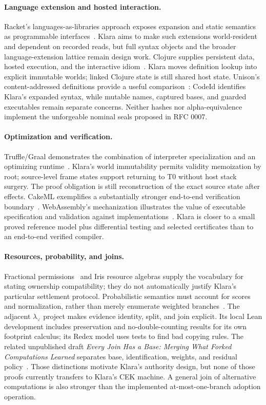 \documentclass[acmsmall,screen,review,nonacm]{acmart}
\begin{document}
\paragraph{Language extension and hosted interaction.}
Racket's languages-as-libraries approach exposes expansion and static semantics
as programmable interfaces~\cite{racket2011}. Klara aims to make such extensions
world-resident and dependent on recorded reads, but full syntax objects and
the broader language-extension lattice remain design work. Clojure supplies
persistent data, hosted execution, and the interactive idiom~\cite{clojure2020}.
Klara moves definition lookup into explicit immutable worlds; linked Clojure
state is still shared host state. Unison's content-addressed definitions
provide a useful comparison~\cite{unison}: CodeId identifies Klara's expanded
syntax, while mutable names, captured bases, and guarded executables remain
separate concerns. Neither hashes nor alpha-equivalence implement the
unforgeable nominal seals proposed in RFC 0007.

\paragraph{Optimization and verification.}
Truffle/Graal demonstrates the combination of interpreter specialization and
an optimizing runtime~\cite{truffle2013}. Klara's world immutability permits
validity memoization by root; source-level frame states support returning to
T0 without host stack surgery. The proof obligation is still reconstruction
of the exact source state after effects. CakeML exemplifies a substantially
stronger end-to-end verification boundary~\cite{cakeml2014}. WebAssembly's
mechanization illustrates the value of executable specification and validation
against implementations~\cite{watt2018}. Klara is closer to a small proved
reference model plus differential testing and selected certificates than to
an end-to-end verified compiler.

\paragraph{Resources, probability, and joins.}
Fractional permissions~\cite{boyland2003} and Iris resource algebras
\cite{iris2018} supply the vocabulary for stating ownership compatibility;
they do not automatically justify Klara's particular settlement protocol.
Probabilistic semantics must account for scores and normalization, rather than
merely enumerate weighted branches~\cite{staton2016}. The adjacent
$\lambda_\vee$ project makes evidence identity, split, and join explicit.
Its local Lean development includes preservation and no-double-counting
results for its own footprint calculus; its Redex model uses tests to find
bad copying rules. The related unpublished draft \emph{Every Join Has a Base:
Merging What Forked Computations Learned} separates base, identification,
weights, and residual policy~\cite{joinsdraft}. Those distinctions motivate
Klara's authority design, but none of those proofs currently transfers to
Klara's CEK machine. A general join of alternative computations is also
stronger than the implemented at-most-one-branch adoption operation.
\end{document}
